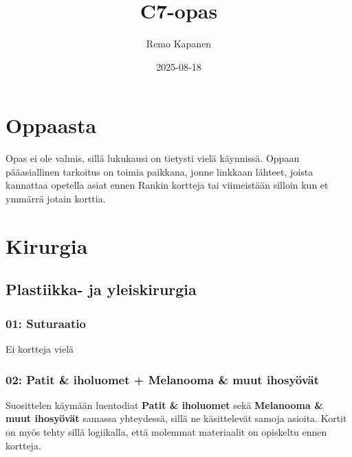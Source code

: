 \documentclass[
]{book}
\title{C7-opas}
\author{Remo Kapanen}
\date{2025-08-18}
\begin{document}
\maketitle

{
\setcounter{tocdepth}{1}
\tableofcontents
}
\chapter{Oppaasta}\label{oppaasta}

Opas ei ole valmis, sillä lukukausi on tietysti vielä käynnissä. Oppaan pääasiallinen tarkoitus on toimia paikkana, jonne linkkaan lähteet, joista kannattaa opetella asiat ennen Rankin kortteja tai viimeistään silloin kun et ymmärrä jotain korttia.

\chapter{Kirurgia}\label{kirurgia}

\section{Plastiikka- ja yleiskirurgia}\label{plastiikka--ja-yleiskirurgia}

\subsection{01: Suturaatio}\label{suturaatio}

Ei kortteja vielä

\subsection{02: Patit \& iholuomet + Melanooma \& muut ihosyövät}\label{Ihosyovat}

Suosittelen käymään luentodiat \textbf{Patit \& iholuomet} sekä \textbf{Melanooma \& muut ihosyövät} samassa yhteydessä, sillä ne käsittelevät samoja asioita. Kortit on myös tehty sillä logiikalla, että molemmat materiaalit on opiskeltu ennen kortteja.
\end{document}
